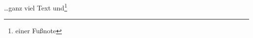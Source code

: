 \documentclass[a4paper]{article}
\begin{document}
\ldots ganz viel Text 
und\footnote{einer Fu\ss note}
\end{document}
